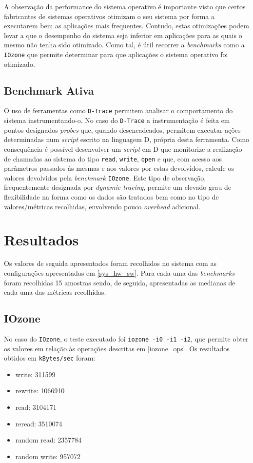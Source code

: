 \documentclass{article}
\begin{document}
A observação da performance do sistema operativo é importante visto que certos fabricantes de sistemas operativos otimizam o seu sistema por forma a 
executarem bem as aplicações mais frequentes. Contudo, estas otimizações podem levar a que o desempenho do sistema seja inferior em aplicações para
as quais o mesmo não tenha sido otimizado. Como tal, é útil recorrer a \textit{benchmarks} como a \texttt{IOzone} que permite determinar para que 
aplicações o sistema operativo foi otimizado.

\subsection{Benchmark Ativa}
O uso de ferramentas como \texttt{D-Trace} permitem analisar o comportamento do sistema instrumentando-o. No caso do \texttt{D-Trace} a instrumentação
é feita em pontos designados \textit{probes} que, quando desencadeados, permitem executar ações determinadas num \textit{script} escrito na linguagem
D, própria desta ferramenta.
Como consequência é possível desenvolver um \textit{script} em D que monitorize a realização de chamadas ao sistema do tipo \texttt{read}, \texttt{write},
\texttt{open} e que, com acesso aos parâmetros passados às mesmas e aos valores por estas devolvidos, calcule os valores devolvidos pela \textit{benchmark}
\texttt{IOzone}.
Este tipo de observação, frequentemente designada por \textit{dynamic tracing}, permite um elevado grau de flexibilidade na forma como os dados são tratados
bem como no tipo de valores/métricas recolhidas, envolvendo pouco \textit{overhead} adicional.

\section{Resultados}
Os valores de seguida apresentados foram recolhidos no sistema com as configurações apresentadas em \ref{sys_hw_sw}.
Para cada uma das \textit{benchmarks} foram recolhidas 15 amostras sendo, de seguida, apresentadas as medianas de cada uma das métricas recolhidas.

\subsection{IOzone}
No caso do \texttt{IOzone}, o teste executado foi \verb|iozone -i0 -i1 -i2|, que permite obter os valores em relação às operações descritas em \ref{iozone_ops}. Os resultados obtidos em \texttt{kBytes/sec} foram:

\begin{itemize}
    \item write: 311599
    \item rewrite: 1066910
    \item read: 3104171
    \item reread: 3510074
    \item random read: 2357784
    \item random write: 957072 
\end{itemize}
\end{document}
